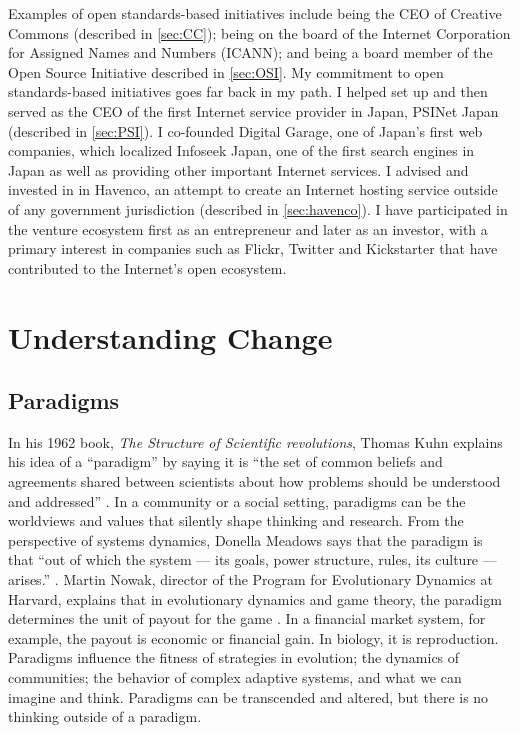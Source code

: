 Examples of open standards-based initiatives include being the CEO of Creative Commons (described in \autoref{sec:CC}); being on the board of the Internet Corporation for Assigned Names and Numbers (ICANN); and being a board member of the Open Source Initiative described in \autoref{sec:OSI}. My commitment to open standards-based initiatives goes far back in my path. I helped set up and then served as the CEO of the first Internet service provider in Japan, PSINet Japan (described in \autoref{sec:PSI}). I co-founded Digital Garage, one of Japan's first web companies, which localized Infoseek Japan, one of the first search engines in Japan as well as providing other important Internet services. I advised and invested in in Havenco, an attempt to create an Internet hosting service outside of any government jurisdiction (described in \autoref{sec:havenco}). I have participated in the venture ecosystem first as an entrepreneur and later as an investor, with a primary interest in companies such as Flickr, Twitter and Kickstarter that have contributed to the Internet's open ecosystem.

\section{Understanding Change}
\subsection{Paradigms}
\label{intro:paradigms}

In his 1962 book, \textit{The Structure of Scientific revolutions}, Thomas Kuhn explains his idea of a ``paradigm'' by saying it is ``the set of common beliefs and agreements shared between scientists about how problems should be understood and addressed'' \cite{kuhn_structure_1970}. In a community or a social setting, paradigms can be the worldviews and values that silently shape thinking and research. From the perspective of systems dynamics, Donella Meadows says that the paradigm is that ``out of which the system --- its goals, power structure, rules, its culture --- arises.'' \cite{meadows_leverage}. Martin Nowak, director of the Program for Evolutionary Dynamics at Harvard, explains that in evolutionary dynamics and game theory, the paradigm determines the unit of payout for the game \cite{nowak2006evolutionary}. In a financial market system, for example, the payout is economic or financial gain. In biology, it is reproduction. Paradigms influence the fitness of strategies in evolution; the dynamics of communities; the behavior of complex adaptive systems, and what we can imagine and think. Paradigms can be transcended and altered, but there is no thinking outside of a paradigm.

